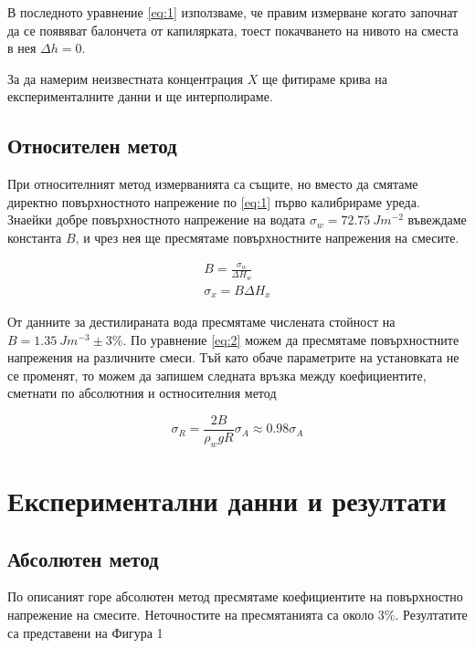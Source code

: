 \documentclass[reprint,amsmath,amssymb,aps,floatfix]{revtex4-2}
\begin{document}
В последното уравнение \eqref{eq:1} използваме, че правим измерване когато започнат да се появяват балончета от капилярката, тоест покачването на нивото на сместа в нея $\Delta h = 0$. 

За да намерим неизвестната концентрация $X$ ще фитираме крива на експерименталните данни и ще интерполираме. 

\subsection{Относителен метод}

При относителният метод измерванията са същите, но вместо да смятаме директно повърхностното напрежение по \eqref{eq:1} първо калибрираме уреда. Знаейки добре повърхностното напрежение на водата $\sigma_w = 72.75 \ \si{J m^{-2}}$ въвеждаме константа $B$, и чрез нея ще пресмятаме повърхностните напрежения на смесите. 

\begin{gather*}
    B = \frac{\sigma_w}{\Delta H_w} \\
    \sigma_x = B \Delta H_x \label{eq:2} \tag{2}
\end{gather*}

От данните за дестилираната вода пресмятаме числената стойност на $B = 1.35 \ \si{Jm^{-3}} \pm 3\% $. 
По уравнение \eqref{eq:2} можем да пресмятаме повърхностните напрежения на различните смеси. Тъй като обаче параметрите на установката не се променят, то можем да запишем следната връзка между коефициентите, сметнати по абсолютния и остносителния метод

\begin{equation*}
    \sigma_R = \frac{2B}{\rho_w g R} \sigma_A \label{eq:3} \approx 0.98 \sigma_A  \tag{3}
\end{equation*}

\section{Експериментални данни и резултати}
\subsection{Абсолютен метод}

По описаният горе абсолютен метод пресмятаме коефициентите на повърхностно напрежение на смесите. Неточностите на пресмятанията са около $3\%$. Резултатите са представени на Фигура 1 
\end{document}
